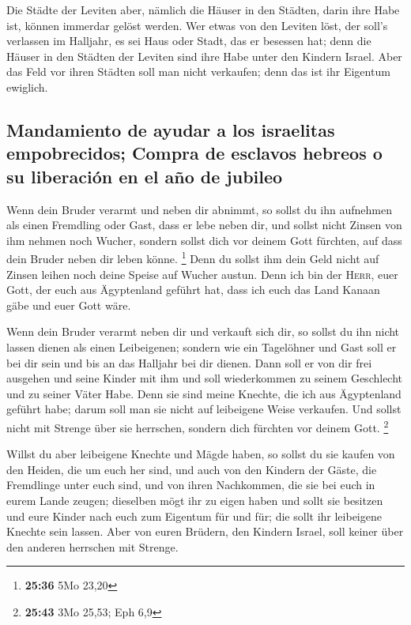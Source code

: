  Die Städte der Leviten aber, nämlich die Häuser in den
Städten, darin ihre Habe ist, können immerdar gelöst werden.
 Wer etwas von den Leviten löst, der soll's verlassen im
Halljahr, es sei Haus oder Stadt, das er besessen hat; denn die Häuser
in den Städten der Leviten sind ihre Habe unter den Kindern Israel.
 Aber das Feld vor ihren Städten soll man nicht
verkaufen; denn das ist ihr Eigentum ewiglich.

\hypertarget{mandamiento-de-ayudar-a-los-israelitas-empobrecidos-compra-de-esclavos-hebreos-o-su-liberaciuxf3n-en-el-auxf1o-de-jubileo}{%
\subsection{Mandamiento de ayudar a los israelitas empobrecidos; Compra
de esclavos hebreos o su liberación en el año de
jubileo}\label{mandamiento-de-ayudar-a-los-israelitas-empobrecidos-compra-de-esclavos-hebreos-o-su-liberaciuxf3n-en-el-auxf1o-de-jubileo}}

 Wenn dein Bruder verarmt und neben dir abnimmt, so
sollst du ihn aufnehmen als einen Fremdling oder Gast, dass er lebe
neben dir,  und sollst nicht Zinsen von ihm nehmen noch
Wucher, sondern sollst dich vor deinem Gott fürchten, auf dass dein
Bruder neben dir leben könne. \footnote{\textbf{25:36} 5Mo 23,20}
 Denn du sollst ihm dein Geld nicht auf Zinsen leihen
noch deine Speise auf Wucher austun.  Denn ich bin der
\textsc{Herr}, euer Gott, der euch aus Ägyptenland geführt hat, dass ich
euch das Land Kanaan gäbe und euer Gott wäre.

 Wenn dein Bruder verarmt neben dir und verkauft sich
dir, so sollst du ihn nicht lassen dienen als einen Leibeigenen;
 sondern wie ein Tagelöhner und Gast soll er bei dir sein
und bis an das Halljahr bei dir dienen.  Dann soll er von
dir frei ausgehen und seine Kinder mit ihm und soll wiederkommen zu
seinem Geschlecht und zu seiner Väter Habe.  Denn sie
sind meine Knechte, die ich aus Ägyptenland geführt habe; darum soll man
sie nicht auf leibeigene Weise verkaufen.  Und sollst
nicht mit Strenge über sie herrschen, sondern dich fürchten vor deinem
Gott. \footnote{\textbf{25:43} 3Mo 25,53; Eph 6,9}

 Willst du aber leibeigene Knechte und Mägde haben, so
sollst du sie kaufen von den Heiden, die um euch her sind,
 und auch von den Kindern der Gäste, die Fremdlinge unter
euch sind, und von ihren Nachkommen, die sie bei euch in eurem Lande
zeugen; dieselben mögt ihr zu eigen haben  und sollt sie
besitzen und eure Kinder nach euch zum Eigentum für und für; die sollt
ihr leibeigene Knechte sein lassen. Aber von euren Brüdern, den Kindern
Israel, soll keiner über den anderen herrschen mit Strenge.


